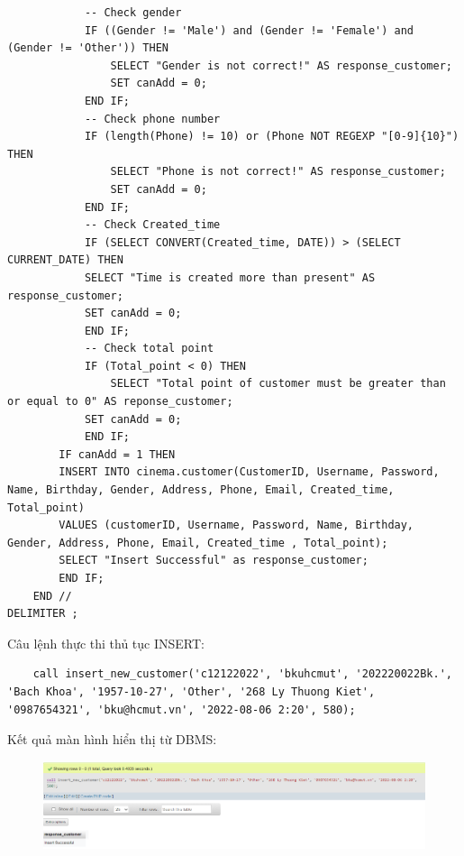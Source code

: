 \begin{verbatim}
            -- Check gender
            IF ((Gender != 'Male') and (Gender != 'Female') and (Gender != 'Other')) THEN
                SELECT "Gender is not correct!" AS response_customer;
                SET canAdd = 0;
            END IF;
            -- Check phone number
            IF (length(Phone) != 10) or (Phone NOT REGEXP "[0-9]{10}") THEN
                SELECT "Phone is not correct!" AS response_customer;
                SET canAdd = 0;
            END IF;
            -- Check Created_time
            IF (SELECT CONVERT(Created_time, DATE)) > (SELECT CURRENT_DATE) THEN
        	SELECT "Time is created more than present" AS response_customer;
            SET canAdd = 0;
            END IF;
            -- Check total point
            IF (Total_point < 0) THEN
                SELECT "Total point of customer must be greater than or equal to 0" AS reponse_customer;
            SET canAdd = 0;
            END IF;
        IF canAdd = 1 THEN
        INSERT INTO cinema.customer(CustomerID, Username, Password, Name, Birthday, Gender, Address, Phone, Email, Created_time, Total_point) 
        VALUES (customerID, Username, Password, Name, Birthday, Gender, Address, Phone, Email, Created_time , Total_point);
        SELECT "Insert Successful" as response_customer;
        END IF;
    END //
DELIMITER ;
    \end{verbatim}
    Câu lệnh thực thi thủ tục INSERT:
    \begin{verbatim}
    call insert_new_customer('c12122022', 'bkuhcmut', '202220022Bk.', 'Bach Khoa', '1957-10-27', 'Other', '268 Ly Thuong Kiet', '0987654321', 'bku@hcmut.vn', '2022-08-06 2:20', 580);
    \end{verbatim}
    
    Kết quả màn hình hiển thị từ DBMS: 

    \begin{figure}[h]
        \centering
        \includegraphics[scale=0.5]{images/insertNewCustomer.png}
    \end{figure}
    
